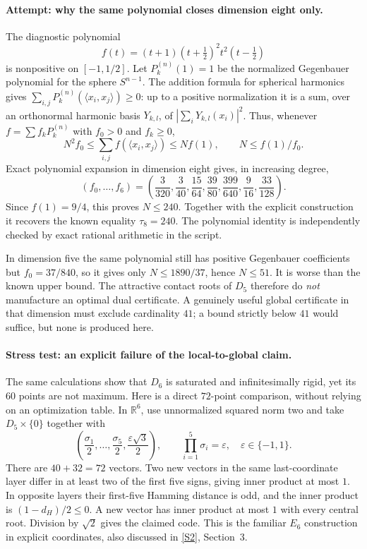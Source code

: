 \documentclass[11pt,a4paper]{article}
\newcommand{\R}{\mathbb{R}}
\newcommand{\sref}[2]{\hyperlink{source:#1:#2}{[S#2]}}
\numberwithin{equation}{section}
\begin{document}
\paragraph{Attempt: why the same polynomial closes dimension eight only.}
The diagnostic polynomial
\[
 f(t)=(t+1)(t+\tfrac12)^2t^2(t-\tfrac12)
\]
is nonpositive on $[-1,1/2]$. Let $P_k^{(n)}(1)=1$ be the normalized
Gegenbauer polynomial for the sphere $S^{n-1}$. The addition formula for
spherical harmonics gives
$\sum_{i,j}P_k^{(n)}(\langle x_i,x_j\rangle)\geq0$:
up to a positive normalization it is a sum, over an orthonormal harmonic
basis $Y_{k,l}$, of $|\sum_iY_{k,l}(x_i)|^2$.
Thus, whenever $f=\sum f_kP_k^{(n)}$ with $f_0>0$ and $f_k\geq0$,
\[
 N^2f_0\leq\sum_{i,j}f(\langle x_i,x_j\rangle)\leq Nf(1),
 \qquad N\leq f(1)/f_0.
\]
Exact polynomial expansion in dimension eight gives, in increasing degree,
\[
 (f_0,\ldots,f_6)=
 \left(\frac3{320},\frac3{40},\frac{15}{64},\frac{39}{80},
       \frac{399}{640},\frac9{16},\frac{33}{128}\right).
\]
Since $f(1)=9/4$, this proves $N\leq240$. Together with the explicit
construction it recovers the known equality $\tau_8=240$.
The polynomial identity is independently checked by exact rational
arithmetic in the script.

In dimension five the same polynomial still has positive Gegenbauer
coefficients but $f_0=37/840$, so it gives only
$N\leq1890/37$, hence $N\leq51$. It is worse than the known upper bound.
The attractive contact roots of $D_5$ therefore do \emph{not} manufacture
an optimal dual certificate. A genuinely useful global certificate in
that dimension must exclude cardinality $41$; a bound strictly below $41$
would suffice, but none is produced here.

\paragraph{Stress test: an explicit failure of the local-to-global claim.}
The same calculations show that $D_6$ is saturated and infinitesimally
rigid, yet its $60$ points are not maximum. Here is a direct $72$-point
comparison, without relying on an optimization table. In $\R^6$, use
unnormalized squared norm two and take $D_5\times\{0\}$ together with
\[
 \left(\frac{\sigma_1}2,\ldots,\frac{\sigma_5}2,
               \frac{\varepsilon\sqrt3}2\right),
 \qquad \prod_{i=1}^5\sigma_i=\varepsilon,
 \quad \varepsilon\in\{-1,1\}.
\]
There are $40+32=72$ vectors. Two new vectors in the same last-coordinate
layer differ in at least two of the first five signs, giving inner product
at most $1$. In opposite layers their first-five Hamming distance is odd,
and the inner product is $(1-d_H)/2\leq0$. A new vector has inner product
at most $1$ with every central root. Division by $\sqrt2$ gives the
claimed code. This is the familiar $E_6$ construction in explicit
coordinates, also discussed in \sref{statement}{2}, Section~3.
\end{document}
